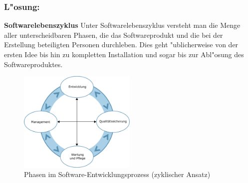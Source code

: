 \subsubsection*{L"osung:}

\begin{defi}
  \textbf{Softwarelebenszyklus}
  \smallbreak
  Unter Softwarelebenszyklus versteht man die Menge aller unterscheidbaren Phasen, die das Softwareprodukt und die bei der Erstellung beteiligten Personen durchleben. Dies geht "ublicherweise von der ersten Idee bis hin zu kompletten Installation und sogar bis zur Abl"osung des Softwareproduktes.
\end{defi}
\smallbreak

\begin{figure}[H]
  \centering
  \includegraphics[width=0.5\textwidth]{./images/AbbEntwicklgProzess.png}
  \captionsetup{name=Abb.,font=footnotesize}
  \caption{Phasen im Software-Entwicklungsprozess (zyklischer Ansatz)}
\end{figure}
\newpage


